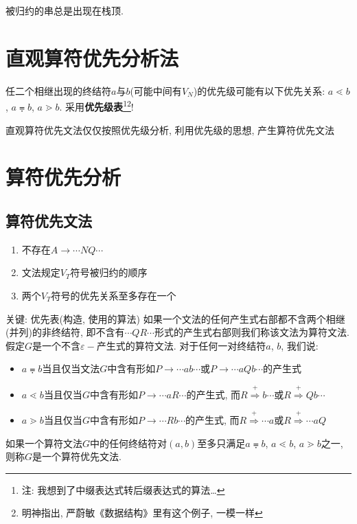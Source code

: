         被归约的串总是出现在栈顶.

    \section{直观算符优先分析法}

        任二个相继出现的终结符$a$与$b$(可能中间有$V_N$)的优先级可能有以下优先关系: $a\lessdot b$, $a\eqdot b$, $a\gtrdot b$. 采用\textbf{优先级表}\footnote{注: 我想到了中缀表达式转后缀表达式的算法\ldots}\footnote{明神指出, 严蔚敏《数据结构》里有这个例子, 一模一样}!
        
        直观算符优先文法仅仅按照优先级分析, 利用优先级的思想, 产生算符优先文法

    \section{算符优先分析}

        \subsection{算符优先文法}

            \begin{enumerate}
                \item 不存在$A\to \cdots NQ\cdots$
                \item 文法规定$V_T$符号被归约的顺序
                \item 两个$V_T$符号的优先关系至多存在一个
            \end{enumerate}

            关键: \textsf{优先表}(构造, 使用的算法)
            如果一个文法的任何产生式右部都不含两个相继(并列)的非终结符, 即不含有$\cdots QR\cdots$形式的产生式右部则我们称该文法为\textsf{算符文法}. 假定$G$是一个不含$\varepsilon-$产生式的算符文法. 对于任何一对终结符$a$, $b$, 我们说: 
            \begin{itemize}
                \item $a\eqdot b$当且仅当文法$G$中含有形如$P\to \cdots ab\cdots$或$P\to \cdots aQb\cdots$的产生式
                \item $a\lessdot b$当且仅当$G$中含有形如$P\to \cdots aR\cdots$的产生式, 而$R\stackrel{+}{\Rightarrow}b\cdots$或$R\stackrel{+}{\Rightarrow}Qb\cdots$
                \item $a\gtrdot b$当且仅当$G$中含有形如$P\to \cdots Rb\cdots$的产生式, 而$R\stackrel{+}{\Rightarrow}\cdots a$或$R\stackrel{+}{\Rightarrow}\cdots aQ$
            \end{itemize}
            如果一个算符文法$G$中的任何终结符对$(a,b)$至多只满足$a\eqdot b$, $a\lessdot b$, $a\gtrdot b$之一, 则称$G$是一个\textsf{算符优先文法}.

